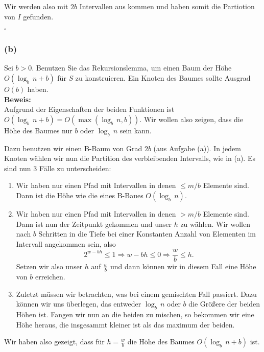 \documentclass[11pt,a4paper,ngerman]{article}
\begin{document}
Wir werden also mit $2b$ Intervallen aus kommen und haben somit die Partiotion von $I$ gefunden.

\mbox{}\hfill$\square$

\subsubsection*{(b)}

Sei $b > 0$. Benutzen Sie das Rekursionslemma, um einen Baum der Höhe $O(\log_b \, n + b)$ für $S$ zu konstruieren. Ein Knoten des Baumes sollte Ausgrad $O(b)$ haben.\\

\noindent\textbf{Beweis:}\\

Aufgrund der Eigenschaften der beiden Funktionen ist $O(\log_b \, n + b) = O(\max(\log_b \, n, b))$. Wir wollen also zeigen, dass die Höhe des Baumes nur $b$ oder $\log_b \, n$ sein kann.

Dazu benutzen wir einen B-Baum von Grad $2b$ (aus Aufgabe (a)). In jedem Knoten wählen
wir nun die Partition des verbleibenden Intervalls, wie in (a). 
Es sind nun 3 Fälle zu unterscheiden:
\begin{enumerate}
   \item Wir haben nur einen Pfad mit Intervallen in denen $\leq m/b$ Elemente sind. 
      Dann ist
      die Höhe wie die eines B-Baues $O(\log_b \, n)$.
   \item Wir haben nur einen Pfad mit Intervallen in denen $>m/b$ Elemente sind.
      Dann ist nun der Zeitpunkt gekommen und unser $h$ zu wählen. Wir wollen 
      nach $b$ Schritten in die Tiefe bei einer Konstanten Anzahl von Elementen im
      Intervall angekommen sein, also
      $$
         2^{w-bh} \leq 1 \Rightarrow w-bh \leq 0 \Rightarrow \frac{w}{b} \leq h.
      $$
      Setzen wir also unser $h$ auf $\frac{w}{b}$ und dann können wir in diesem
      Fall eine Höhe von $b$ erreichen.
   \item Zuletzt müssen wir betrachten, was bei einem gemischten Fall passiert.
      Dazu können wir uns überlegen, das entweder $\log_b \, n$ oder $b$ die Größere
      der beiden Höhen ist. Fangen wir nun an die beiden zu mischen, so bekommen
      wir eine Höhe heraus, die insgesammt kleiner ist als das maximum der beiden.
\end{enumerate}

Wir haben also gezeigt, dass für $h = \frac{w}{b}$ die Höhe des Baumes $O(\log_b \, n + b)$ ist.
\end{document}
